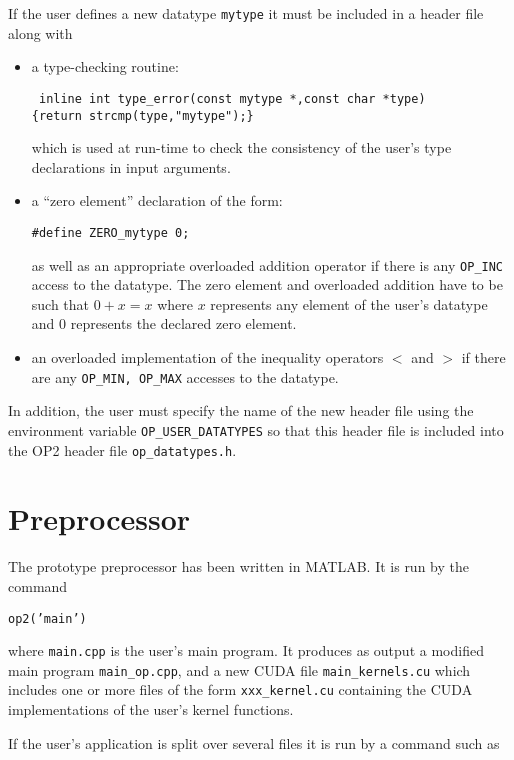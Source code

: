 \documentclass[11pt]{article}
\begin{document}
If the user defines a new datatype {\tt mytype} it must be included in
a header file along with
\begin{itemize}
\item
a type-checking routine:

{\tt 
inline int type\_error(const mytype *,const char *type)\\
\{return strcmp(type,"mytype");\}
}

which is used at run-time to check the consistency of the user's type declarations
in input arguments.

\item

a ``zero element'' declaration of the form:

{\tt \#define ZERO\_mytype    0;}

as well as an appropriate overloaded addition operator  if there is any 
{\tt OP\_INC} access to the datatype.  The zero element and overloaded 
addition have to be such that $0 + x = x$ where $x$ represents any element 
of the user's datatype and $0$ represents the declared zero element.

\item

an overloaded implementation of the inequality operators $<$ and $>$ 
if there are any {\tt OP\_MIN, OP\_MAX} accesses to the datatype.

\end{itemize}

In addition, the user must specify the name of the new header file using the 
environment variable {\tt OP\_USER\_DATATYPES}
so that this header file is included into the OP2 header file {\tt op\_datatypes.h}.




\section{Preprocessor}

The prototype preprocessor has been written in MATLAB.  It is run by the command

{\tt op2('main')}

\noindent
where {\tt main.cpp} is the user's main program.  It produces as output a 
modified main program {\tt main\_op.cpp}, and a new CUDA file {\tt main\_kernels.cu}
which includes one or more files of the form {\tt xxx\_kernel.cu} containing 
the CUDA implementations of the user's kernel functions.

If the user's application is split over several files it is run by a command such as
\end{document}
